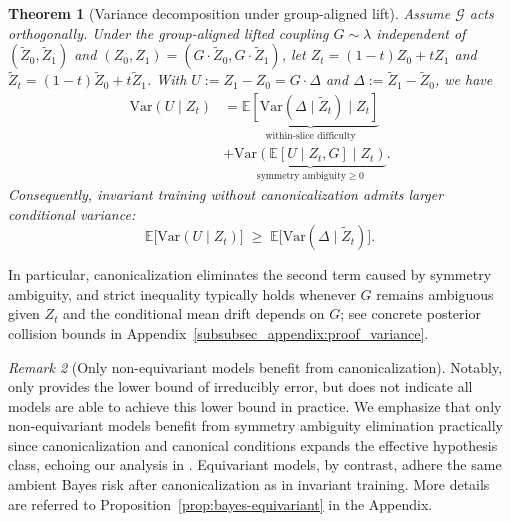\documentclass{article}
\theoremstyle{plain}
\newtheorem{theorem}{Theorem}[section]
\theoremstyle{definition}
\theoremstyle{remark}
\newtheorem{remark}[theorem]{Remark}
\newcommand{\1}{\mathbf{1}}
\begin{document}
\begin{theorem}[Variance decomposition under group-aligned lift]
\label{thm:canon-var-decomp}
Assume $\mathcal{G}$ acts orthogonally. Under the group-aligned lifted coupling
$G\sim\lambda$ independent of $(\widetilde Z_0,\widetilde Z_1)$ and $(Z_0,Z_1)=(G\cdot\widetilde Z_0,G\cdot\widetilde Z_1)$,
let $Z_t=(1-t)Z_0+tZ_1$ and $\widetilde Z_t=(1-t)\widetilde Z_0+t\widetilde Z_1$.
With $U:=Z_1-Z_0=G\cdot\Delta$ and $\Delta:=\widetilde Z_1-\widetilde Z_0$, we have
\begin{equation}\label{eq:canon-var-decomp}
\begin{aligned}
\mathrm{Var}(U\mid Z_t)&=
\underbrace{\mathbb{E}\!\left[\mathrm{Var}(\Delta\mid \widetilde Z_t)\mid Z_t\right]}_{\text{within-slice difficulty}}\\
&+\underbrace{\mathrm{Var}\!\left(\mathbb{E}[U\mid Z_t,G]\mid Z_t\right)}_{\text{symmetry ambiguity}\ge 0}.
\end{aligned}
\end{equation}
Consequently, invariant training without canonicalization admits larger conditional variance:
\begin{equation}\label{eq:canon-var-ineq}
\mathbb{E}\big[\mathrm{Var}(U\mid Z_t)\big]\;\ge\;\mathbb{E}\big[\mathrm{Var}(\Delta\mid \widetilde Z_t)\big].
\end{equation}
\end{theorem}
In particular, canonicalization eliminates the second term caused by symmetry ambiguity, and strict inequality typically holds whenever $G$ remains ambiguous given $Z_t$ and the conditional mean drift depends on $G$; see concrete posterior collision bounds in Appendix~\ref{subsubsec_appendix:proof_variance}.

\begin{remark}[Only non-equivariant models benefit from canonicalization]\label{remark:non-equi-benefit}
Notably,  only provides the lower bound of irreducibly error, but does not indicate all models are able to achieve this lower bound in practice. We emphasize that only non-equivariant models benefit from symmetry ambiguity elimination practically since canonicalization and canonical conditions expands the effective hypothesis class, echoing our analysis in . Equivariant models, by contrast, adhere the same ambient Bayes risk after canonicalization as in invariant training. More details are referred to Proposition~\ref{prop:bayes-equivariant} in the Appendix.
\end{remark}
\end{document}
